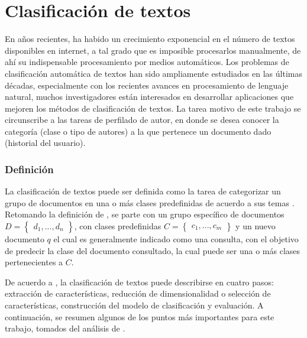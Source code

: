 \section{Clasificación de textos}

En años recientes, ha habido un crecimiento exponencial en el número de textos disponibles en internet, a tal grado que es imposible procesarlos manualmente, de ahí su indispensable procesamiento por medios automáticos. Los problemas de clasificación automática de textos han sido ampliamente estudiados en las últimas décadas, especialmente con los recientes avances en procesamiento de lenguaje natural, muchos investigadores están interesados en desarrollar aplicaciones que mejoren los métodos de clasificación de textos. La tarea motivo de este trabajo se circunscribe a las tareas de perfilado de autor, en donde se desea conocer la categoría (clase o tipo de autores) a la que pertenece un documento dado (historial del usuario).

\subsubsection{Definición}

La clasificación de textos puede ser definida como la tarea de categorizar un grupo de documentos en una o más clases predefinidas de acuerdo a sus temas \citep{Kadhim2019}. Retomando la definición de \citep{Kadhim2019}, se parte con un grupo específico de documentos $D={\begin{Bmatrix} d_1 , ... , d_n \end{Bmatrix}}$, con clases predefinidas $C={\begin{Bmatrix} c_1 , ... , c_m \end{Bmatrix}}$ y un nuevo documento $q$ el cual es generalmente indicado como una consulta, con el objetivo de predecir la clase del documento consultado, la cual puede ser una o más clases pertenecientes a $C$.

De acuerdo a \citep{kowsari2019text}, la clasificación de textos puede describirse en cuatro pasos: extracción de características, reducción de dimensionalidad o selección de características, construcción del modelo de clasificación y evaluación. A continuación, se resumen algunos de los puntos más importantes para este trabajo, tomados del análisis de \citep{kowsari2019text}.
